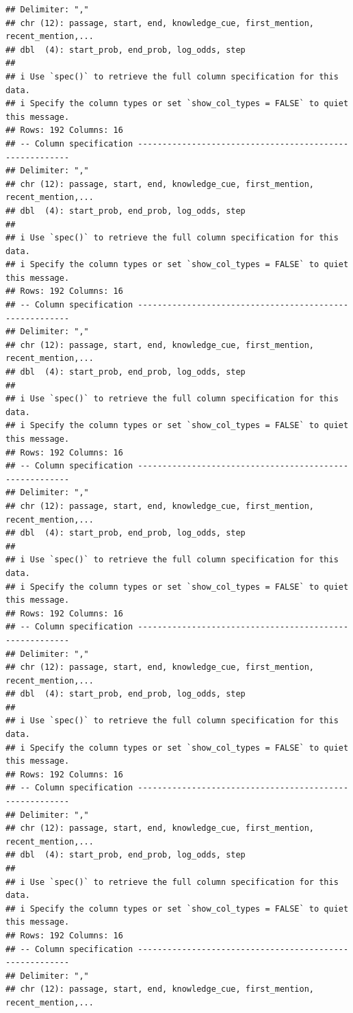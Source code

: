 \documentclass[
]{article}
\begin{document}
\begin{verbatim}
## Delimiter: ","
## chr (12): passage, start, end, knowledge_cue, first_mention, recent_mention,...
## dbl  (4): start_prob, end_prob, log_odds, step
## 
## i Use `spec()` to retrieve the full column specification for this data.
## i Specify the column types or set `show_col_types = FALSE` to quiet this message.
## Rows: 192 Columns: 16
## -- Column specification --------------------------------------------------------
## Delimiter: ","
## chr (12): passage, start, end, knowledge_cue, first_mention, recent_mention,...
## dbl  (4): start_prob, end_prob, log_odds, step
## 
## i Use `spec()` to retrieve the full column specification for this data.
## i Specify the column types or set `show_col_types = FALSE` to quiet this message.
## Rows: 192 Columns: 16
## -- Column specification --------------------------------------------------------
## Delimiter: ","
## chr (12): passage, start, end, knowledge_cue, first_mention, recent_mention,...
## dbl  (4): start_prob, end_prob, log_odds, step
## 
## i Use `spec()` to retrieve the full column specification for this data.
## i Specify the column types or set `show_col_types = FALSE` to quiet this message.
## Rows: 192 Columns: 16
## -- Column specification --------------------------------------------------------
## Delimiter: ","
## chr (12): passage, start, end, knowledge_cue, first_mention, recent_mention,...
## dbl  (4): start_prob, end_prob, log_odds, step
## 
## i Use `spec()` to retrieve the full column specification for this data.
## i Specify the column types or set `show_col_types = FALSE` to quiet this message.
## Rows: 192 Columns: 16
## -- Column specification --------------------------------------------------------
## Delimiter: ","
## chr (12): passage, start, end, knowledge_cue, first_mention, recent_mention,...
## dbl  (4): start_prob, end_prob, log_odds, step
## 
## i Use `spec()` to retrieve the full column specification for this data.
## i Specify the column types or set `show_col_types = FALSE` to quiet this message.
## Rows: 192 Columns: 16
## -- Column specification --------------------------------------------------------
## Delimiter: ","
## chr (12): passage, start, end, knowledge_cue, first_mention, recent_mention,...
## dbl  (4): start_prob, end_prob, log_odds, step
## 
## i Use `spec()` to retrieve the full column specification for this data.
## i Specify the column types or set `show_col_types = FALSE` to quiet this message.
## Rows: 192 Columns: 16
## -- Column specification --------------------------------------------------------
## Delimiter: ","
## chr (12): passage, start, end, knowledge_cue, first_mention, recent_mention,...

\end{verbatim}
\end{document}
